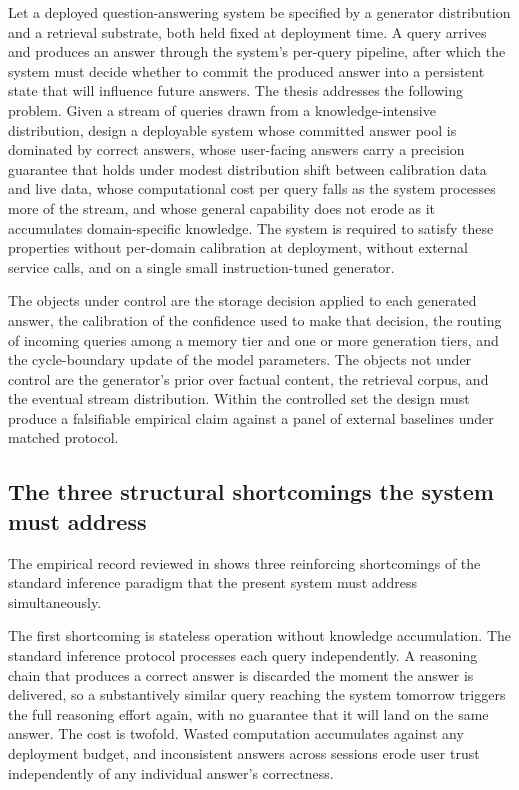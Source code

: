 Let a deployed question-answering system be specified by a generator distribution and a retrieval substrate, both held fixed at deployment time. A query arrives and produces an answer through the system's per-query pipeline, after which the system must decide whether to commit the produced answer into a persistent state that will influence future answers. The thesis addresses the following problem. Given a stream of queries drawn from a knowledge-intensive distribution, design a deployable system whose committed answer pool is dominated by correct answers, whose user-facing answers carry a precision guarantee that holds under modest distribution shift between calibration data and live data, whose computational cost per query falls as the system processes more of the stream, and whose general capability does not erode as it accumulates domain-specific knowledge. The system is required to satisfy these properties without per-domain calibration at deployment, without external service calls, and on a single small instruction-tuned generator.

The objects under control are the storage decision applied to each generated answer, the calibration of the confidence used to make that decision, the routing of incoming queries among a memory tier and one or more generation tiers, and the cycle-boundary update of the model parameters. The objects not under control are the generator's prior over factual content, the retrieval corpus, and the eventual stream distribution. Within the controlled set the design must produce a falsifiable empirical claim against a panel of external baselines under matched protocol.

\subsection{The three structural shortcomings the system must address}
\label{sec:three-shortcomings}

The empirical record reviewed in  shows three reinforcing shortcomings of the standard inference paradigm that the present system must address simultaneously.

The first shortcoming is stateless operation without knowledge accumulation. The standard inference protocol processes each query independently. A reasoning chain that produces a correct answer is discarded the moment the answer is delivered, so a substantively similar query reaching the system tomorrow triggers the full reasoning effort again, with no guarantee that it will land on the same answer. The cost is twofold. Wasted computation accumulates against any deployment budget, and inconsistent answers across sessions erode user trust independently of any individual answer's correctness.

